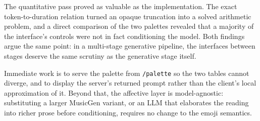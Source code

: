\documentclass[11pt]{article}
\begin{document}
The quantitative pass proved as valuable as the implementation. The exact
token-to-duration relation turned an opaque truncation into a solved
arithmetic problem, and a direct comparison of the two palettes revealed that
a majority of the interface's controls were not in fact conditioning the
model. Both findings argue the same point: in a multi-stage generative
pipeline, the interfaces between stages deserve the same scrutiny as the
generative stage itself.

Immediate work is to serve the palette from \texttt{/palette} so the two
tables cannot diverge, and to display the server's returned prompt rather
than the client's local approximation of it. Beyond that, the affective layer
is model-agnostic: substituting a larger MusicGen variant, or an LLM that
elaborates the reading into richer prose before conditioning, requires no
change to the emoji semantics.
\end{document}
